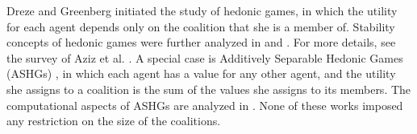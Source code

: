 \documentclass[sigconf]{aamas}
\begin{document}
Dreze and Greenberg \cite{dreze1980hedonic} initiated the study of hedonic games,
in which the utility for each agent depends only on the coalition that she is a member of. Stability concepts of hedonic games were further analyzed in \cite{banerjee2001core} and \cite{cechlarova2001stability}. For more details, see the survey of Aziz et al. \cite{aziz2016hedonic}.
A special case is Additively Separable Hedonic Games (ASHGs) \cite{bogomolnaia2002stability}, in which each agent has a value for any other agent, and the utility she assigns to a coalition is the sum of the values she assigns to its members. The computational aspects of ASHGs are analyzed in \cite{deng1994complexity,ballester2004np,olsen2009nash,sung2010computational,aziz2013computing,Bachrach2013,bilo2019optimality}. %
None of these works imposed any restriction on the size of the coalitions.
\end{document}
